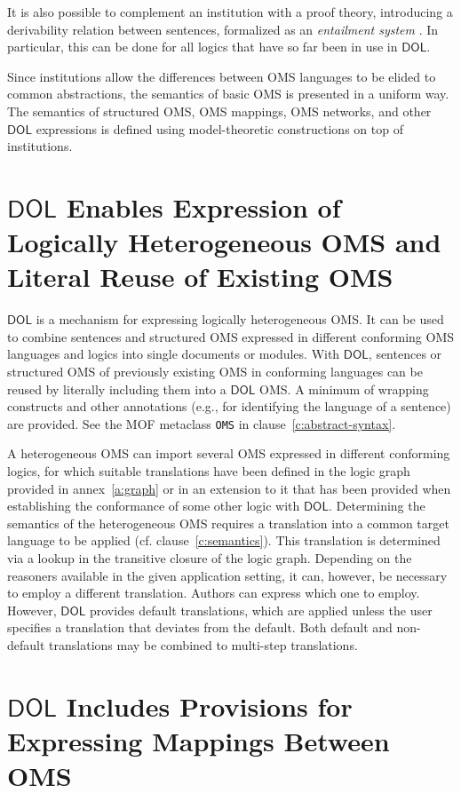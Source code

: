 \documentclass[10pt,fleqn,final]{scrreprt}
\makeatletter
\newcommand*{\cf}{cf.\@\xspace}
\newcommand*{\syntax}[1]{\texttt{#1}}
\newcommand*{\DOL}{\ensuremath{\mathsf{DOL}}\xspace}
\newcommand{\annexrefname}{annex}
\newcommand{\clauserefname}{clause}
\newcommand{\aref}[1]{\annexrefname~\ref{#1}}
\newcommand{\cref}[1]{\clauserefname~\ref{#1}}
\makeatother
\begin{document}
It is also possible to complement an institution with a proof theory,
introducing a derivability relation between sentences, formalized as 
an \emph{entailment system} \cite{Meseguer89}. In particular, this
can be done for all logics that have so far been in use in \DOL.


Since institutions allow the differences between OMS languages to be elided to common abstractions, 
the semantics of basic OMS is presented in a uniform way.  The semantics of structured OMS, 
OMS mappings, OMS networks, and other \DOL expressions is defined using model-theoretic constructions
on top of institutions. 


\section{\DOL Enables Expression of Logically Heterogeneous OMS and Literal Reuse of Existing OMS}
\DOL is a mechanism for expressing logically heterogeneous OMS. It can be used to combine sentences and structured OMS expressed in different conforming OMS languages
and logics into single documents or modules. With \DOL, sentences or structured OMS of previously existing OMS in
conforming languages can be reused by literally including them into a \DOL OMS. A minimum of wrapping constructs and other annotations (e.g., for identifying the language of a sentence) are provided. 
 See the
 MOF metaclass   \syntax{OMS} in
clause~\ref{c:abstract-syntax}.

A heterogeneous OMS can import several OMS expressed in different
conforming logics, for which suitable translations have been defined
in the logic graph provided in \aref{a:graph} or in an extension to it
that has been provided when establishing the conformance of some other
logic with \DOL.  Determining the semantics of the heterogeneous OMS
requires a translation into a common target language to be applied
(\cf \cref{c:semantics}).  This translation is determined via a lookup
in the transitive closure of the logic graph.  Depending on the
reasoners available in the given application setting, it can, however,
be necessary to employ a different translation.  Authors can express
which one to employ.   However, \DOL provides default translations, which are 
applied unless the user specifies a translation that deviates from the default. Both default and non-default translations may be combined to multi-step translations. 

\section{\DOL Includes Provisions for Expressing Mappings Between OMS}\label{c:req:links}
\end{document}
